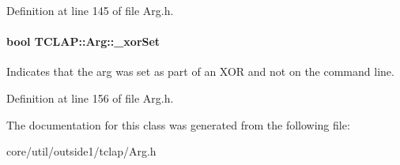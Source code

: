 Definition at line 145 of file Arg.\+h.

\paragraph[{\texorpdfstring{\+\_\+xor\+Set}{_xorSet}}]{\setlength{\rightskip}{0pt plus 5cm}bool T\+C\+L\+A\+P\+::\+Arg\+::\+\_\+xor\+Set\hspace{0.3cm}{\ttfamily [protected]}}\hypertarget{classTCLAP_1_1Arg_ab413bd1d8a7ecf3c89672ee23ef791ba}{}\label{classTCLAP_1_1Arg_ab413bd1d8a7ecf3c89672ee23ef791ba}
Indicates that the arg was set as part of an X\+OR and not on the command line. 

Definition at line 156 of file Arg.\+h.



The documentation for this class was generated from the following file\+:\begin{DoxyCompactItemize}
\item 
core/util/outside1/tclap/Arg.\+h\end{DoxyCompactItemize}
